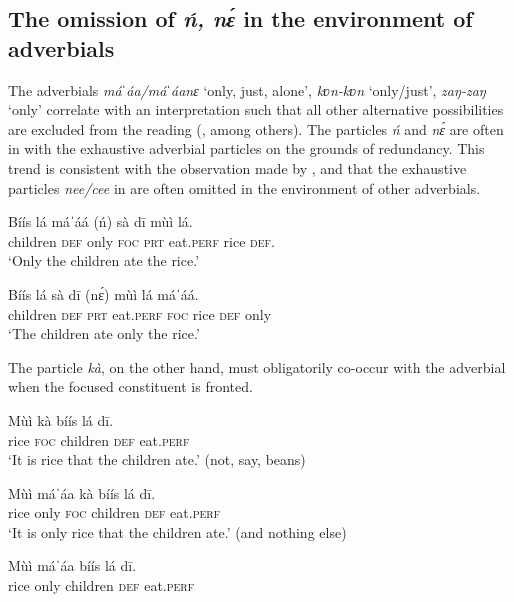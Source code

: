 \documentclass[output=paper,modfonts,nonflat,
 hidelinks
]{langsci/langscibook}
\begin{document}
 
\subsection{The omission of \textit{ń, nɛ́} in the environment of adverbials}\label{sec:abubakari:4.1}
 

The adverbials \textit{máˈáa/máˈáanɛ} `only, just, alone', \textit{kʋn-kʋn} ‘only/just’, \textit{zaŋ-zaŋ} ‘only’ correlate with an  interpretation such that all other alternative possibilities are excluded from the reading (\citealt[see][]{rooth1985,Rooth1992,krifka2006,vanderWal2013}, among others). The particles \textit{ń} and \textit{nɛ́} are often in  with the exhaustive adverbial particles on the grounds of redundancy. This trend is consistent with the observation made by \citet[256]{hartmann2007}, \citet[511]{jaggar2001} and \citet[190]{newman2000hausa} that the exhaustive particles \textit{nee/cee} in  are often omitted in the environment of other adverbials. 

 
\ea\label{ex:abubakari:27}
\gll Bíís    lá  máˈáá    (ń)  sà  dī mùì  lá.\\
children  \textsc{def}  only    \textsc{foc}  \textsc{prt}  eat.\textsc{perf}  rice  \textsc{def}.\\
\glt ‘Only the children ate the rice.’ 
\z 

 
\ea\label{ex:abubakari:28} 
\gll Bíís    lá  sà  dī    (nɛ́)  mùì  lá máˈáá.\\
children  \textsc{def}  \textsc{prt}  eat.\textsc{perf}  \textsc{foc}  rice   \textsc{def} only\\
\glt ‘The children ate only the rice.’ 
\z 

The particle \textit{kà}, on the other hand, must obligatorily co-occur with the adverbial when the focused constituent is fronted.

 
\ea\label{ex:abubakari:29} 
\gll Mùì  kà  bíís    lá  dī.\\
rice  \textsc{foc}  children  \textsc{def}  eat.\textsc{perf}\\
\glt ‘It is rice that the children ate.’ (not, say, beans)
\z
 
\ea\label{ex:abubakari:30} 
\gll Mùì  máˈáa    kà  bíís    lá  dī.\\
rice  only    \textsc{foc}  children  \textsc{def}  eat.\textsc{perf}\\
\glt ‘It is only rice that the children ate.’ (and nothing else)

\gll     *Mùì    máˈáa    bíís    lá  dī.\\
rice    only    children  \textsc{def}  eat.\textsc{perf}\\
\glt
\z
\end{document}
